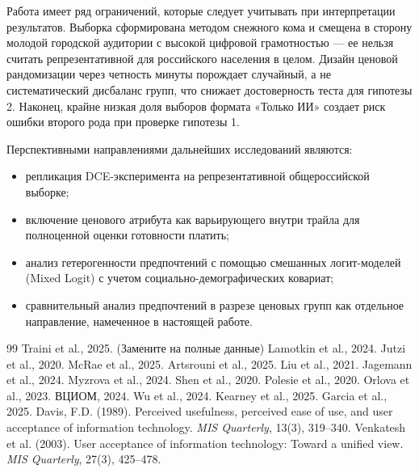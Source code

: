\documentclass[12pt, a4paper]{article}
\begin{document}
Работа имеет ряд ограничений, которые следует учитывать при интерпретации результатов. Выборка сформирована методом снежного кома и смещена в сторону молодой городской аудитории с высокой цифровой грамотностью --- ее нельзя считать репрезентативной для российского населения в целом. Дизайн ценовой рандомизации через четность минуты порождает случайный, а не систематический дисбаланс групп, что снижает достоверность теста для гипотезы 2. Наконец, крайне низкая доля выборов формата «Только ИИ» создает риск ошибки второго рода при проверке гипотезы 1.

Перспективными направлениями дальнейших исследований являются:
\begin{itemize}
    \item репликация DCE-эксперимента на репрезентативной общероссийской выборке;
    \item включение ценового атрибута как варьирующего внутри трайла для полноценной оценки готовности платить;
    \item анализ гетерогенности предпочтений с помощью смешанных логит-моделей (Mixed Logit) с учетом социально-демографических ковариат;
    \item сравнительный анализ предпочтений в разрезе ценовых групп как отдельное направление, намеченное в настоящей работе.
\end{itemize}

\begin{thebibliography}{99}
 Traini et al., 2025. (Замените на полные данные)
 Lamotkin et al., 2024.
 Jutzi et al., 2020.
 McRae et al., 2025.
 Artsrouni et al., 2025.
 Liu et al., 2021.
 Jagemann et al., 2024.
 Myzrova et al., 2024.
 Shen et al., 2020.
 Polesie et al., 2020.
 Orlova et al., 2023.
 ВЦИОМ, 2024.
 Wu et al., 2024.
 Kearney et al., 2025.
 Garcia et al., 2025.
 Davis, F.D. (1989). Perceived usefulness, perceived ease of use, and user acceptance of information technology. \textit{MIS Quarterly}, 13(3), 319–340.
 Venkatesh et al. (2003). User acceptance of information technology: Toward a unified view. \textit{MIS Quarterly}, 27(3), 425–478.
\end{thebibliography}
\end{document}
